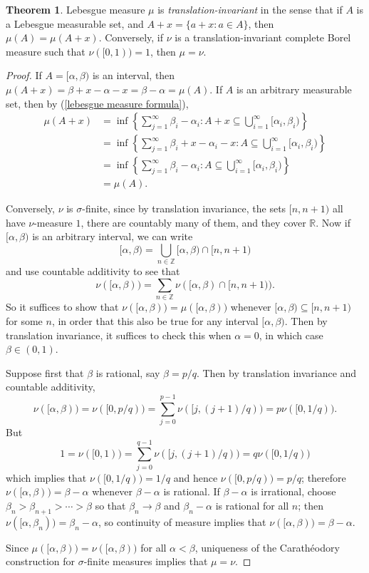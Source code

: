 \documentclass[12pt]{book}
\newcommand{\ZZ}{\mathbb{Z}}
\newcommand{\RR}{\mathbb{R}}
\newcommand{\dfn}[1]{\emph{#1}\index{#1}}
\theoremstyle{definition}
\newtheorem{theorem}{Theorem}[section]
\begin{document}
\begin{theorem}
\label{translation invariance in R1}
Lebesgue measure $\mu$ is \dfn{translation-invariant} in the sense that if $A$ is a Lebesgue measurable set, and $A + x = \{a + x: a \in A\}$, then $\mu(A) = \mu(A + x)$.
Conversely, if $\nu$ is a translation-invariant complete Borel measure such that $\nu([0, 1)) = 1$, then $\mu = \nu$.
\end{theorem}
\begin{proof}
If $A = [\alpha, \beta)$ is an interval, then $\mu(A + x) = \beta + x - \alpha - x = \beta - \alpha = \mu(A)$.
If $A$ is an arbitrary measurable set, then by (\ref{lebesgue measure formula}),
\begin{align*}
\mu(A + x) &= \inf \left\{\sum_{j=1}^\infty \beta_i - \alpha_i: A + x\subseteq \bigcup_{i=1}^\infty [\alpha_i, \beta_i)\right\} \\
&= \inf \left\{\sum_{j=1}^\infty \beta_i + x- \alpha_i - x: A \subseteq \bigcup_{i=1}^\infty [\alpha_i, \beta_i)\right\}\\
&= \inf \left\{\sum_{j=1}^\infty \beta_i - \alpha_i: A \subseteq \bigcup_{i=1}^\infty [\alpha_i, \beta_i)\right\}\\
&= \mu(A).
\end{align*}

Conversely, $\nu$ is $\sigma$-finite, since by translation invariance, the sets $[n, n + 1)$ all have $\nu$-measure $1$, there are countably many of them, and they cover $\RR$.
Now if $[\alpha, \beta)$ is an arbitrary interval, we can write
$$[\alpha, \beta) = \bigcup_{n\in\ZZ} [\alpha, \beta) \cap [n, n + 1)$$
and use countable additivity to see that
$$\nu([\alpha, \beta)) = \sum_{n\in\ZZ} \nu([\alpha, \beta) \cap [n, n + 1)).$$
So it suffices to show that $\nu([\alpha, \beta)) = \mu([\alpha, \beta))$ whenever $[\alpha, \beta) \subseteq [n, n + 1)$ for some $n$, in order that this also be true for any interval $[\alpha, \beta)$.
Then by translation invariance, it suffices to check this when $\alpha = 0$, in which case $\beta \in (0, 1)$.

Suppose first that $\beta$ is rational, say $\beta = p/q$. Then by translation invariance and countable additivity,
$$\nu([\alpha, \beta)) = \nu([0, p/q)) = \sum_{j=0}^{p-1} \nu([j, (j+1)/q)) = p\nu([0, 1/q)).$$
But
$$1 = \nu([0, 1)) = \sum_{j=0}^{q-1} \nu([j, (j+1)/q)) = q\nu([0, 1/q))$$
which implies that $\nu([0, 1/q)) = 1/q$ and hence $\nu([0, p/q)) = p/q$; therefore $\nu([\alpha, \beta)) = \beta - \alpha$ whenever $\beta - \alpha$ is rational.
If $\beta - \alpha$ is irrational, choose $\beta_n > \beta_{n+1} > \cdots > \beta$ so that $\beta_n \to \beta$ and $\beta_n - \alpha$ is rational for all $n$; then $\nu([\alpha, \beta_n)) = \beta_n - \alpha$, so continuity of measure implies that $\nu([\alpha, \beta)) = \beta - \alpha$.

Since $\mu([\alpha, \beta)) = \nu([\alpha, \beta))$ for all $\alpha < \beta$, uniqueness of the Carathéodory construction for $\sigma$-finite measures implies that $\mu = \nu$.
\end{proof}
\end{document}

